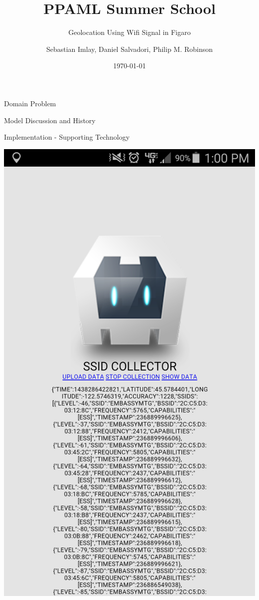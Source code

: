 \documentclass[11pt]{beamer}
\begin{document}
\title{PPAML Summer School}

\subtitle{Geolocation Using Wifi Signal in Figaro}

\author{Sebastian Imlay, Daniel Salvadori, Philip M. Robinson}


\date{\today}

\begin{frame}
  \titlepage
\end{frame}


\begin{frame}{Domain Problem}

\end{frame}

\begin{frame}{Model Discussion and History}

\end{frame}

\begin{frame}{Implementation - Supporting Technology}

\includegraphics[height=0.7\textheight]{phoneapp.png}
\end{frame}
\end{document}
